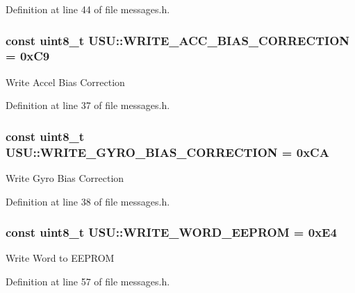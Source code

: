 \-Definition at line 44 of file messages.\-h.

\hypertarget{namespace_u_s_u_a16dfbf07cc906050d4685de10f84c3d8}{
\subsubsection[{\-W\-R\-I\-T\-E\-\_\-\-A\-C\-C\-\_\-\-B\-I\-A\-S\-\_\-\-C\-O\-R\-R\-E\-C\-T\-I\-O\-N}]{\setlength{\rightskip}{0pt plus 5cm}const uint8\-\_\-t {\bf \-U\-S\-U\-::\-W\-R\-I\-T\-E\-\_\-\-A\-C\-C\-\_\-\-B\-I\-A\-S\-\_\-\-C\-O\-R\-R\-E\-C\-T\-I\-O\-N} = 0x\-C9}}\label{namespace_u_s_u_a16dfbf07cc906050d4685de10f84c3d8}
\-Write \-Accel \-Bias \-Correction 

\-Definition at line 37 of file messages.\-h.

\hypertarget{namespace_u_s_u_a7e0bd6ee510ca1a1aded8b277a6c5c6a}{
\subsubsection[{\-W\-R\-I\-T\-E\-\_\-\-G\-Y\-R\-O\-\_\-\-B\-I\-A\-S\-\_\-\-C\-O\-R\-R\-E\-C\-T\-I\-O\-N}]{\setlength{\rightskip}{0pt plus 5cm}const uint8\-\_\-t {\bf \-U\-S\-U\-::\-W\-R\-I\-T\-E\-\_\-\-G\-Y\-R\-O\-\_\-\-B\-I\-A\-S\-\_\-\-C\-O\-R\-R\-E\-C\-T\-I\-O\-N} = 0x\-C\-A}}\label{namespace_u_s_u_a7e0bd6ee510ca1a1aded8b277a6c5c6a}
\-Write \-Gyro \-Bias \-Correction 

\-Definition at line 38 of file messages.\-h.

\hypertarget{namespace_u_s_u_a483eb9b7abe528d9fe3e843b4655a977}{
\subsubsection[{\-W\-R\-I\-T\-E\-\_\-\-W\-O\-R\-D\-\_\-\-E\-E\-P\-R\-O\-M}]{\setlength{\rightskip}{0pt plus 5cm}const uint8\-\_\-t {\bf \-U\-S\-U\-::\-W\-R\-I\-T\-E\-\_\-\-W\-O\-R\-D\-\_\-\-E\-E\-P\-R\-O\-M} = 0x\-E4}}\label{namespace_u_s_u_a483eb9b7abe528d9fe3e843b4655a977}
\-Write \-Word to \-E\-E\-P\-R\-O\-M 

\-Definition at line 57 of file messages.\-h.

